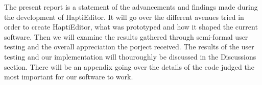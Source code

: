 The present report is a statement of the advancements and findings made during the development of HaptiEditor. 
It will go over the different avenues tried in order to create HaptiEditor, what was prototyped and how it shaped the current software. 
Then we will examine the results gathered through semi-formal user testing and the overall appreciation the porject received. 
The results of the user testing and our implementation will thouroughly be discussed in the Discussions section.
There will be an appendix going over the details of the code judged the most important for our software to work.
